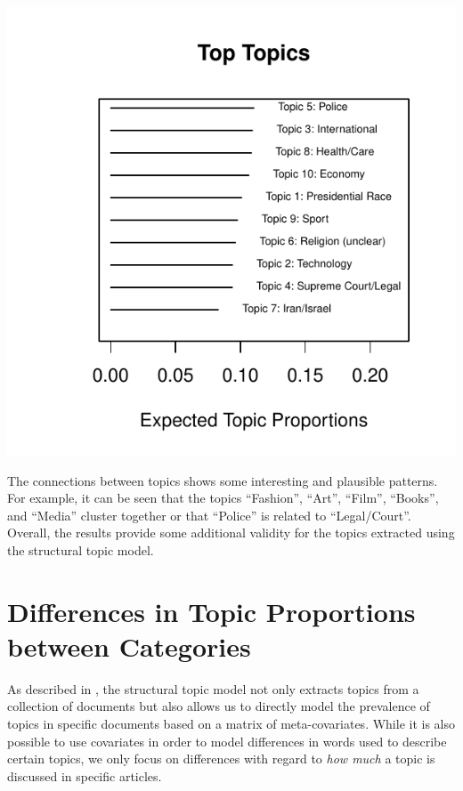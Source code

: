 \documentclass[12pt]{article}\usepackage[]{graphicx}\usepackage[]{color}
\makeatletter
\def\maxwidth{ %
  \ifdim\Gin@nat@width>\linewidth
    \linewidth
  \else
    \Gin@nat@width
  \fi
}
\newenvironment{knitrout}{}{} %
\makeatother
\begin{document}
\begin{knitrout}
\color{fgcolor}
\includegraphics[width=\maxwidth]{figure/unnamed-chunk-5-1} 

\end{knitrout}

The connections between topics shows some interesting and plausible patterns. For example, it can be seen that the topics ``Fashion'', ``Art'', ``Film'', ``Books'', and ``Media'' cluster together or that ``Police'' is related to ``Legal/Court''. Overall, the results provide some additional validity for the topics extracted using the structural topic model.


\section{Differences in Topic Proportions between Categories}

As described in \citet{roberts2014structural}, the structural topic model not only extracts topics from a collection of documents but also allows us to directly model the prevalence of topics in specific documents based on a matrix of meta-covariates. While it is also possible to use covariates in order to model differences in words used to describe certain topics, we only focus on differences with regard to \textit{how much} a topic is discussed in specific articles.
\end{document}
